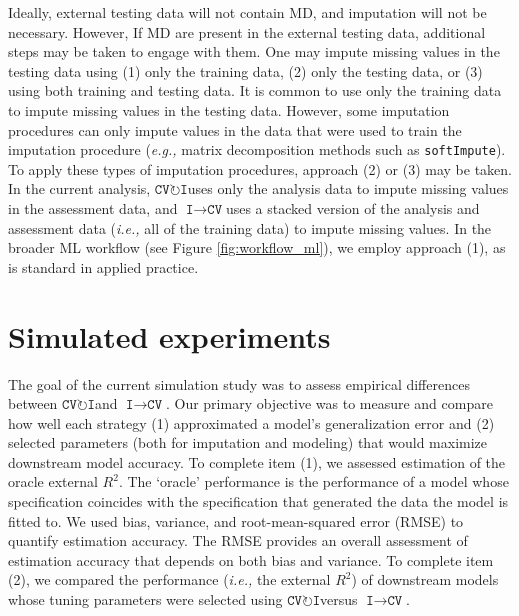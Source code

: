 \documentclass[AMA,STIX1COL,doublespace]{WileyNJD-v2}
\begin{document}
Ideally, external testing data will not contain MD, and imputation will
not be necessary. However, If MD are present in the external testing
data, additional steps may be taken to engage with them. One may impute
missing values in the testing data using (1) only the training data, (2)
only the testing data, or (3) using both training and testing data. It
is common to use only the training data to impute missing values in the
testing data. However, some imputation procedures can only impute values
in the data that were used to train the imputation procedure
(\textit{e.g., }matrix decomposition methods such as
\texttt{softImpute}).\citep{softImpute} To apply these types of
imputation procedures, approach (2) or (3) may be taken. In the current
analysis, $\texttt{CV}\!\circlearrowright\!\texttt{I}$\space uses only
the analysis data to impute missing values in the assessment data, and
$\texttt{I}\!\!\rightarrow\!\texttt{CV}$\space uses a stacked version of
the analysis and assessment data (\textit{i.e., }all of the training
data) to impute missing values. In the broader ML workflow (see Figure
\ref{fig:workflow_ml}), we employ approach (1), as is standard in
applied practice.

\section{Simulated experiments} \label{sec:sim}

The goal of the current simulation study was to assess empirical
differences between
$\texttt{CV}\!\circlearrowright\!\texttt{I}$\space and
$\texttt{I}\!\!\rightarrow\!\texttt{CV}$. Our primary objective was to
measure and compare how well each strategy (1) approximated a model's
generalization error and (2) selected parameters (both for imputation
and modeling) that would maximize downstream model accuracy. To complete
item (1), we assessed estimation of the oracle external \(R^2\). The
`oracle' performance is the performance of a model whose specification
coincides with the specification that generated the data the model is
fitted to. We used bias, variance, and root-mean-squared error (RMSE) to
quantify estimation accuracy. The RMSE provides an overall assessment of
estimation accuracy that depends on both bias and variance. To complete
item (2), we compared the performance (\textit{i.e., }the external
\(R^2\)) of downstream models whose tuning parameters were selected
using $\texttt{CV}\!\circlearrowright\!\texttt{I}$\space versus
$\texttt{I}\!\!\rightarrow\!\texttt{CV}$.
\end{document}
